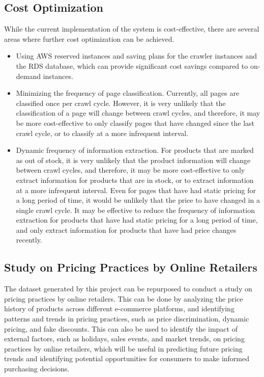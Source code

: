 \subsection{Cost Optimization}\label{subsec:cost-optimization}
While the current implementation of the system is cost-effective, there are several areas where further cost optimization can be achieved.
\begin{itemize}
    \item Using AWS reserved instances and saving plans for the crawler instances and the RDS database, which can provide significant cost savings compared to on-demand instances.
    \item Minimizing the frequency of page classification.
    Currently, all pages are classified once per crawl cycle.
    However, it is very unlikely that the classification of a page will change between crawl cycles, and therefore, it may be more cost-effective to only classify pages that have changed since the last crawl cycle, or to classify at a more infrequent interval.
    \item Dynamic frequency of information extraction.
    For products that are marked as out of stock, it is very unlikely that the product information will change between crawl cycles, and therefore, it may be more cost-effective to only extract information for products that are in stock, or to extract information at a more infrequent interval.
    Even for pages that have had static pricing for a long period of time, it would be unlikely that the price to have changed in a single crawl cycle.
    It may be effective to reduce the frequency of information extraction for products that have had static pricing for a long period of time, and only extract information for products that have had price changes recently.
\end{itemize}

\subsection{Study on Pricing Practices by Online Retailers}\label{subsec:study-on-pricing-practices-by-online-retailers}
The dataset generated by this project can be repurposed to conduct a study on pricing practices by online retailers.
This can be done by analyzing the price history of products across different e-commerce platforms, and identifying patterns and trends in pricing practices, such as price discrimination, dynamic pricing, and fake discounts.
This can also be used to identify the impact of external factors, such as holidays, sales events, and market trends, on pricing practices by online retailers, which will be useful in predicting future pricing trends and identifying potential opportunities for consumers to make informed purchasing decisions.